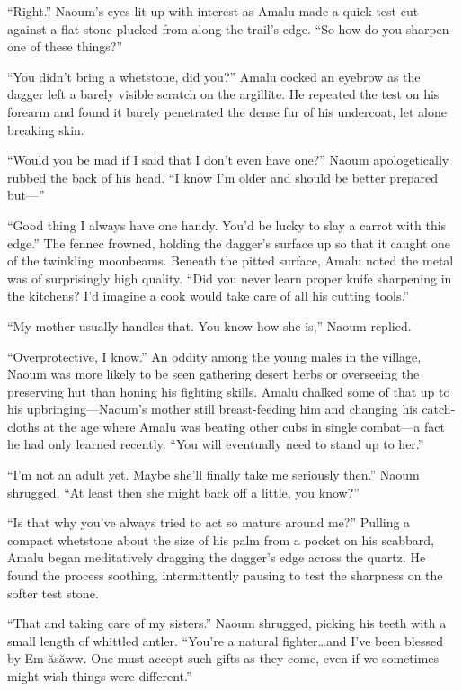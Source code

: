 ``Right.'' Naoum's eyes lit up with interest as Amalu made a quick test cut against a flat stone plucked from along the trail's edge. ``So how do you sharpen one of these things?''

``You didn't bring a whetstone, did you?'' Amalu cocked an eyebrow as the dagger left a barely visible scratch on the argillite. He repeated the test on his forearm and found it barely penetrated the dense fur of his undercoat, let alone breaking skin.

``Would you be mad if I said that I don't even have one?'' Naoum apologetically rubbed the back of his head. ``I know I'm older and should be better prepared but---''

``Good thing I always have one handy. You'd be lucky to slay a carrot with this edge.'' The fennec frowned, holding the dagger's surface up so that it caught one of the twinkling moonbeams. Beneath the pitted surface, Amalu noted the metal was of surprisingly high quality. ``Did you never learn proper knife sharpening in the kitchens? I'd imagine a cook would take care of all his cutting tools.''

``My mother usually handles that. You know how she is,'' Naoum replied.

``Overprotective, I know.'' An oddity among the young males in the village, Naoum was more likely to be seen gathering desert herbs or overseeing the preserving hut than honing his fighting skills. Amalu chalked some of that up to his upbringing---Naoum's mother still breast-feeding him and changing his catch-cloths at the age where Amalu was beating other cubs in single combat---a fact he had only learned recently. ``You will eventually need to stand up to her.''

``I'm not an adult yet. Maybe she'll finally take me seriously then.'' Naoum shrugged. ``At least then she might back off a little, you know?''

``Is that why you've always tried to act so mature around me?'' Pulling a compact whetstone about the size of his palm from a pocket on his scabbard, Amalu began meditatively dragging the dagger's edge across the quartz. He found the process soothing, intermittently pausing to test the sharpness on the softer test stone.

``That and taking care of my sisters.'' Naoum shrugged, picking his teeth with a small length of whittled antler. ``You're a natural fighter\ldots and I've been blessed by Em-ăsăww. One must accept such gifts as they come, even if we sometimes might wish things were different.''

